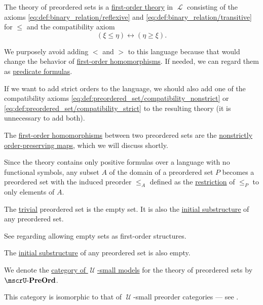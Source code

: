 \begin{definition}
\begin{thmenum}
    The theory of preordered sets is a \hyperref[def:first_order_theory]{first-order theory} in \( \mscrL \) consisting of the axioms \eqref{eq:def:binary_relation/reflexive} and \eqref{eq:def:binary_relation/transitive} for \( \leq \) and the compatibility axiom
    \begin{equation}\label{eq:def:preordered_set/theory}
      (\xi \leq \eta) \leftrightarrow (\eta \geq \xi).
    \end{equation}

    We purposely avoid adding \( < \) and \( > \) to this language because that would change the behavior of \hyperref[def:first_order_homomorphism]{first-order homomorphisms}. If needed, we can regard them as \hyperref[rem:predicate_formula]{predicate formulas}.

    If we want to add strict orders to the language, we should also add one of the compatibility axioms \eqref{eq:def:preordered_set/compatibility_nonstrict} or \eqref{eq:def:preordered_set/compatibility_strict} to the resulting theory (it is unnecessary to add both).

     The \hyperref[def:first_order_homomorphism]{first-order homomorphisms} between two preordered sets are the \hyperref[def:order_homomorphism/increasing]{nonstrictly order-preserving maps}, which we will discuss shortly.

     Since the theory contains only positive formulas over a language with no functional symbols, any subset \( A \) of the domain of a preordered set \( P \) becomes a preordered set with the induced preorder \( \leq_A \) defined as the \hyperref[def:binary_relation/restriction]{restriction} of \( \leq_P \) to only elements of \( A \).

     The \hyperref[rem:trivial_structure]{trivial} preordered set is the empty set. It is also the \hyperref[thm:substructures_form_complete_lattice/bottom]{initial substructure} of any preordered set.

    See  regarding allowing empty sets as first-order structures.

     The \hyperref[thm:substructures_form_complete_lattice/bottom]{initial substructure} of any preordered set is also empty.

      We denote the \hyperref[def:category_of_small_first_order_models]{category of \( \mscrU \)-small models} for the theory of preordered sets by \( \ucat{PreOrd} \).

    This category is isomorphic to that of \( \mscrU \)-small preorder categories --- see .
  \end{thmenum}
\end{definition}

